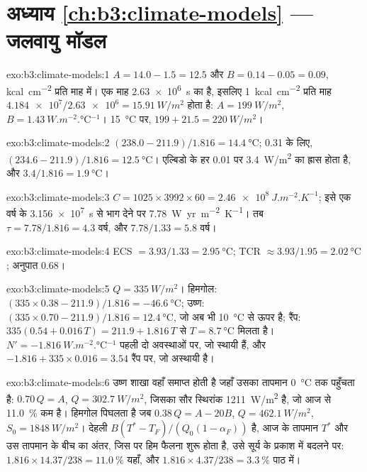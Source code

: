 \section*{अध्याय \ref{ch:b3:climate-models} --- जलवायु मॉडल}

\begin{solution}{exo:b3:climate-models:1}
$A = 14.0 - 1.5 = \num{12.5}$ और $B = 0.14 - 0.05 = \num{0.09}$,
\unit{kcal.cm^{-2}} प्रति माह में। एक माह \qty{2.63e6}{s} का है, इसलिए
\qty{1}{kcal.cm^{-2}} प्रति माह $\num{4.184e7}/\num{2.63e6} =
\qty{15.91}{W/m^2}$ होता है: $A = \qty{199}{W/m^2}$, $B =
\qty{1.43}{W.m^{-2}.\celsius^{-1}}$। \qty{15}{\celsius} पर, $199 + 21.5 =
\qty{220}{W/m^2}$।
\end{solution}

\begin{solution}{exo:b3:climate-models:2}
$(238.0 - 211.9)/1.816 = \qty{14.4}{\celsius}$; 0.31 के लिए, $(234.6 -
211.9)/1.816 = \qty{12.5}{\celsius}$। एल्बिडो के हर 0.01 पर
\qty{3.4}{W/m^2} का ह्रास होता है, और $3.4/1.816 = \qty{1.9}{\celsius}$।
\end{solution}

\begin{solution}{exo:b3:climate-models:3}
$C = 1025\times3992\times60 = \qty{2.46e8}{J.m^{-2}.K^{-1}}$; इसे
एक वर्ष के \qty{3.156e7}{s} से भाग देने पर \qty{7.78}{W.yr.m^{-2}.K^{-1}}। तब $\tau
= 7.78/1.816 = \num{4.3}\text{ वर्ष}$, और $7.78/1.33 = \num{5.8}\text{ वर्ष}$।
\end{solution}

\begin{solution}{exo:b3:climate-models:4}
ECS $= 3.93/1.33 = \qty{2.95}{\celsius}$; TCR $\approx 3.93/1.95 =
\qty{2.02}{\celsius}$; अनुपात \num{0.68}।
\end{solution}

\begin{solution}{exo:b3:climate-models:5}
$Q = \qty{335}{W/m^2}$। हिमगोल: $(335\times0.38 - 211.9)/1.816 =
\qty{-46.6}{\celsius}$; उष्ण: $(335\times0.70 - 211.9)/1.816 =
\qty{12.4}{\celsius}$, जो अब भी \qty{10}{\celsius} से ऊपर है; रैंप: $335(0.54 +
0.016\,T) = 211.9 + 1.816\,T$ से $T = \qty{8.7}{\celsius}$ मिलता है। $N' =
\qty{-1.816}{W.m^{-2}.\celsius^{-1}}$ पहली दो अवस्थाओं पर, जो स्थायी हैं, और $-1.816
+ 335\times0.016 = \num{+3.54}$ रैंप पर, जो अस्थायी है।
\end{solution}

\begin{solution}{exo:b3:climate-models:6}
उष्ण शाखा वहाँ समाप्त होती है जहाँ उसका तापमान \qty{0}{\celsius} तक पहुँचता है:
$0.70\,Q = A$, $Q = \qty{302.7}{W/m^2}$, जिसका सौर स्थिरांक
\qty{1211}{W/m^2} है, जो आज से \qty{11.0}{\percent} कम है। हिमगोल पिघलता है
जब $0.38\,Q = A - 20B$, $Q = \qty{462.1}{W/m^2}$, $S_0 =
\qty{1848}{W/m^2}$। देहली $B(T^* - T_F)/(Q_0(1 - \alpha_F))$ है,
आज के तापमान $T^*$ और उस तापमान के बीच का अंतर, जिस पर
हिम फैलना शुरू होता है, उसे सूर्य के प्रकाश में बदलने पर: $1.816\times14.37/238 =
\qty{11.0}{\percent}$ यहाँ, और $1.816\times4.37/238 = \qty{3.3}{\percent}$
पाठ में।
\end{solution}

